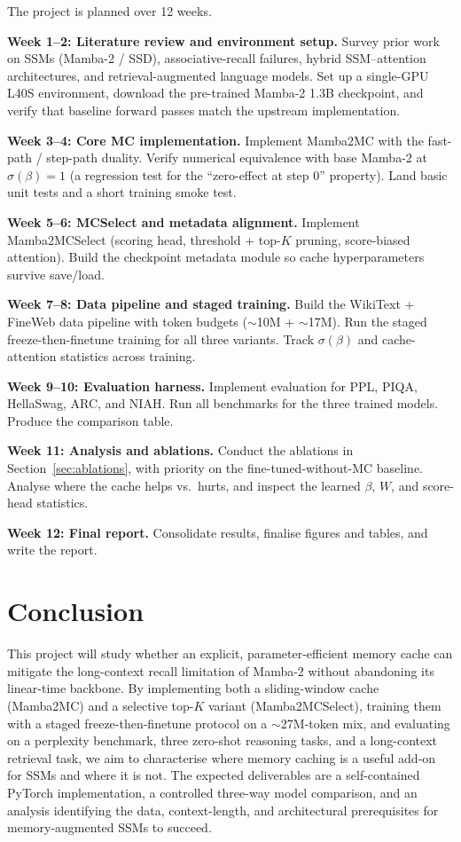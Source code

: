 \documentclass[conference]{IEEEtran}
\begin{document}
The project is planned over 12 weeks.

\textbf{Week 1--2: Literature review and environment setup.}
Survey prior work on SSMs (Mamba-2 / SSD), associative-recall failures, hybrid SSM--attention architectures, and retrieval-augmented language models. Set up a single-GPU L40S environment, download the pre-trained Mamba-2 1.3B checkpoint, and verify that baseline forward passes match the upstream implementation.

\textbf{Week 3--4: Core MC implementation.}
Implement Mamba2MC with the fast-path / step-path duality. Verify numerical equivalence with base Mamba-2 at $\sigma(\beta)=1$ (a regression test for the ``zero-effect at step 0'' property). Land basic unit tests and a short training smoke test.

\textbf{Week 5--6: MCSelect and metadata alignment.}
Implement Mamba2MCSelect (scoring head, threshold + top-$K$ pruning, score-biased attention). Build the checkpoint metadata module so cache hyperparameters survive save/load.

\textbf{Week 7--8: Data pipeline and staged training.}
Build the WikiText + FineWeb data pipeline with token budgets ($\sim$10M + $\sim$17M). Run the staged freeze-then-finetune training for all three variants. Track $\sigma(\beta)$ and cache-attention statistics across training.

\textbf{Week 9--10: Evaluation harness.}
Implement evaluation for PPL, PIQA, HellaSwag, ARC, and NIAH. Run all benchmarks for the three trained models. Produce the comparison table.

\textbf{Week 11: Analysis and ablations.}
Conduct the ablations in Section~\ref{sec:ablations}, with priority on the fine-tuned-without-MC baseline. Analyse where the cache helps vs.\ hurts, and inspect the learned $\beta$, $W$, and score-head statistics.

\textbf{Week 12: Final report.}
Consolidate results, finalise figures and tables, and write the report.

\section{Conclusion}

This project will study whether an explicit, parameter-efficient memory cache can mitigate the long-context recall limitation of Mamba-2 without abandoning its linear-time backbone. By implementing both a sliding-window cache (Mamba2MC) and a selective top-$K$ variant (Mamba2MCSelect), training them with a staged freeze-then-finetune protocol on a $\sim$27M-token mix, and evaluating on a perplexity benchmark, three zero-shot reasoning tasks, and a long-context retrieval task, we aim to characterise where memory caching is a useful add-on for SSMs and where it is not. The expected deliverables are a self-contained PyTorch implementation, a controlled three-way model comparison, and an analysis identifying the data, context-length, and architectural prerequisites for memory-augmented SSMs to succeed.



\end{document}

